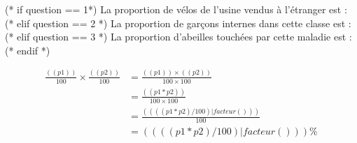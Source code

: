 \exercice*

(* if question == 1*)
La proportion de vélos de l'usine vendus à l'étranger est :
(* elif question == 2 *)
La proportion de garçons internes dans cette classe est :
(* elif question == 3 *)
La proportion d'abeilles touchées par cette maladie est :
(* endif *)

\begin{align*}
    \frac{(( p1 ))}{100} \times \frac{(( p2 ))}{100}
    &= \frac{(( p1 ))\times(( p2 ))}{100\times 100}\\
    &= \frac{(( p1 * p2 ))}{100 \times 100} \\
    &= \frac{(( ((p1 * p2) / 100) | facteur() ))}{100} \\
    &= (( ((p1 * p2) / 100) | facteur() )) \%
\end{align*}

